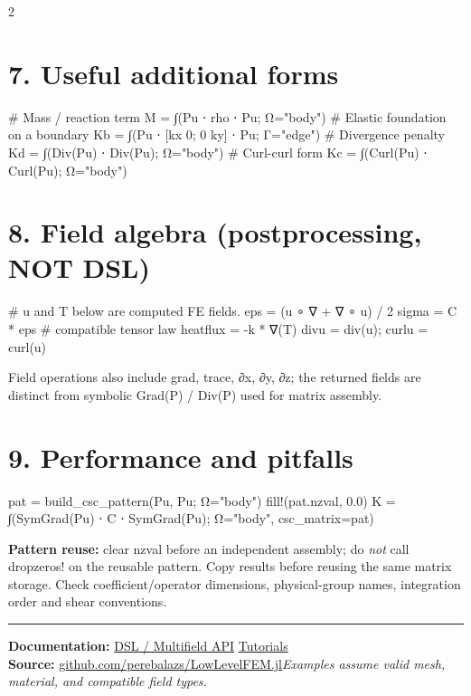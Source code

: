 \documentclass[a4paper,9pt]{extarticle}
\newcommand{\code}[1]{{\ttfamily\small #1}}
\begin{document}
\begin{multicols}{2}
\section{7. Useful additional forms}
\begin{julia}
# Mass / reaction term
M = ∫(Pu ⋅ rho ⋅ Pu; Ω="body")
# Elastic foundation on a boundary
Kb = ∫(Pu ⋅ [kx 0; 0 ky] ⋅ Pu;
       Γ="edge")
# Divergence penalty
Kd = ∫(Div(Pu) ⋅ Div(Pu); Ω="body")
# Curl-curl form
Kc = ∫(Curl(Pu) ⋅ Curl(Pu); Ω="body")
\end{julia}
\section{8. Field algebra (postprocessing, NOT DSL)}
\begin{julia}
# u and T below are computed FE fields.
eps = (u ∘ ∇ + ∇ ∘ u) / 2
sigma = C * eps  # compatible tensor law
heatflux = -k * ∇(T)
divu = div(u); curlu = curl(u)
\end{julia}
Field operations also include \code{grad}, \code{trace}, \code{∂x}, \code{∂y}, \code{∂z}; the returned fields are distinct from symbolic \code{Grad(P)} / \code{Div(P)} used for matrix assembly.
\section{9. Performance and pitfalls}
\begin{julia}
pat = build_csc_pattern(Pu, Pu; Ω="body")
fill!(pat.nzval, 0.0)
K = ∫(SymGrad(Pu) ⋅ C ⋅ SymGrad(Pu);
      Ω="body", csc_matrix=pat)
\end{julia}
\textbf{Pattern reuse:} clear \code{nzval} before an independent assembly; do \emph{not} call \code{dropzeros!} on the reusable pattern. Copy results before reusing the same matrix storage. Check coefficient/operator dimensions, physical-group names, integration order and shear conventions.
\vspace{2mm}\hrule\vspace{1mm}
{\footnotesize\textbf{Documentation:} \href{https://perebalazs.github.io/LowLevelFEM.jl/dev/reference/multifield/}{DSL / Multifield API} \quad \href{https://perebalazs.github.io/LowLevelFEM.jl/dev/tutorials/}{Tutorials}\\
\textbf{Source:} \href{https://github.com/perebalazs/LowLevelFEM.jl}{github.com/perebalazs/LowLevelFEM.jl}\quad\textit{Examples assume valid mesh, material, and compatible field types.}}
\end{multicols}
\end{document}
